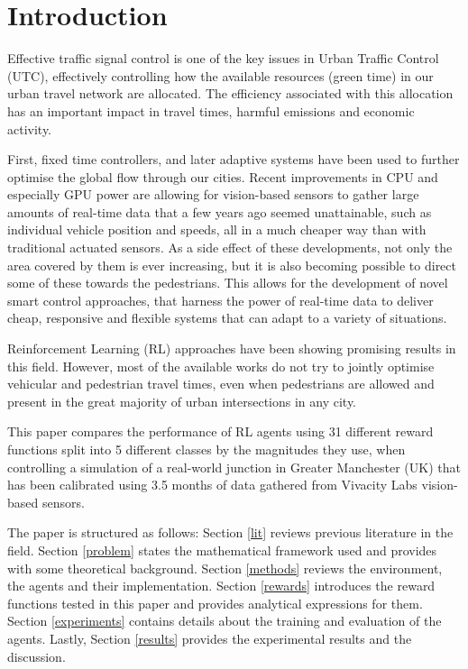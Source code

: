 \documentclass[conference]{IEEEtran}
\begin{document}
\IEEEpeerreviewmaketitle

\section{Introduction}
Effective traffic signal control is one of the key issues in Urban Traffic Control (UTC), effectively controlling how the available resources (green time) in our urban travel network are allocated.
The efficiency associated with this allocation has an important impact in travel times, harmful emissions and economic activity.

First, fixed time controllers, and later adaptive systems have been used to further optimise the global flow through our cities.
Recent improvements in CPU and especially GPU power are allowing for vision-based sensors to gather large amounts of real-time data that a few years ago seemed unattainable, such as individual vehicle position and speeds, all in a much cheaper way than with traditional actuated sensors.
As a side effect of these developments, not only the area covered by them is ever increasing, but it is also becoming possible to direct some of these towards the pedestrians.
This allows for the development of novel smart control approaches, that harness the power of real-time data to deliver cheap, responsive and flexible systems that can adapt to a variety of situations.

Reinforcement Learning (RL) approaches have been showing promising results in this field.
However, most of the available works do not try to jointly optimise vehicular and pedestrian travel times, even when pedestrians are allowed and present in the great majority of urban intersections in any city.

This paper compares the performance of RL agents using 31 different reward functions split into 5 different classes by the magnitudes they use, when controlling a simulation of a real-world junction in Greater Manchester (UK) that has been calibrated using 3.5 months of data gathered from Vivacity Labs vision-based sensors.

The paper is structured as follows:
Section \ref{lit} reviews previous literature in the field.
Section \ref{problem} states the mathematical framework used and provides with some theoretical background.  
Section \ref{methods} reviews the environment, the agents and their implementation.
Section \ref{rewards} introduces the reward functions tested in this paper and provides analytical expressions for them.
Section \ref{experiments} contains details about the training and evaluation of the agents.
Lastly, Section \ref{results} provides the experimental results and the discussion.
\end{document}
